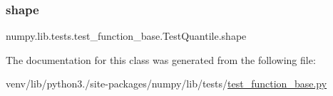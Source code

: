 \subsubsection{\texorpdfstring{shape}{shape}}
{\footnotesize\ttfamily numpy.\+lib.\+tests.\+test\+\_\+function\+\_\+base.\+Test\+Quantile.\+shape\hspace{0.3cm}{\ttfamily [static]}}



The documentation for this class was generated from the following file\+:\begin{DoxyCompactItemize}
\item 
venv/lib/python3./site-\/packages/numpy/lib/tests/\hyperlink{lib_2tests_2test__function__base_8py}{test\+\_\+function\+\_\+base.\+py}\end{DoxyCompactItemize}
